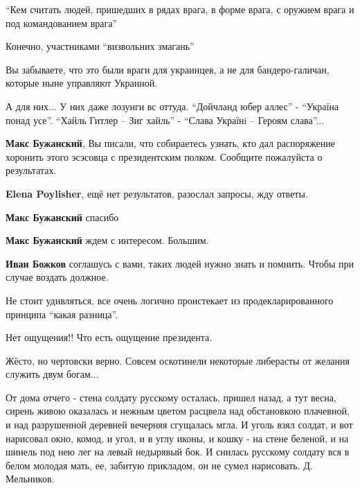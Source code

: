 \begin{itemize}
\begin{itemize}

\enquote{Кем считать людей, пришедших в рядах врага, в форме врага, с оружием врага и под командованием врага}

Конечно, участниками \enquote{визвольних змагань} 🙂

Вы забываете, что это были враги для украинцев, а не для бандеро-галичан, которые ныне управляют Украиной.

А для них... У них даже лозунги вс оттуда. \enquote{Дойчланд юбер аллес} -
\enquote{Україна понад усе}. \enquote{Хайль Гитлер -- Зиг хайль} -
\enquote{Слава Українi -- Героям слава}...

\textbf{Макс Бужанский}, Вы писали, что собираетесь узнать, кто дал
распоряжение хоронить этого эсэсовца с президентским полком. Сообщите
пожалуйста о результатах.

\begin{itemize}
\textbf{Elena Poylisher}, ещё нет результатов, разослал запросы, жду ответы.

\textbf{Макс Бужанский} спасибо

\textbf{Макс Бужанский} ждем с интересом. Большим.

\textbf{Иван Божков} соглашусь с вами, таких людей нужно знать и помнить. Чтобы при случае воздать должное.
\end{itemize}

Не стоит удивляться, все очень логично проистекает из продекларированного принципа \enquote{какая разница}.

Нет ощущения!! Что есть ощущение президента.

Жёсто, но чертовски верно. Совсем оскотинели некоторые либерасты от желания служить двум богам...


\obeycr
От дома отчего - стена
солдату русскому осталась,
пришел назад, а тут весна,
сирень живою оказалась
и нежным цветом расцвела
над обстановкою плачевной,
и над разрушенной деревней
вечерняя сгущалась мгла.
И уголь взял солдат, и вот
нарисовал окно, комод,
и угол, и в углу иконы,
и кошку - на стене беленой,
и на шинель под нею лег
на левый недырявый бок.
И снилась русскому солдату
вся в белом молодая мать,
ее, забитую прикладом,
он не сумел нарисовать.
Д. Мельников.
\restorecr



\end{itemize}
\end{itemize}
